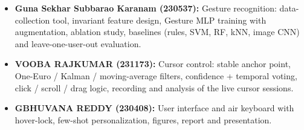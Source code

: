 \begin{itemize}\setlength\itemsep{1pt}
\item \textbf{Guna Sekhar Subbarao Karanam (230537):} Gesture recognition: data-collection tool, invariant feature design, Gesture MLP training with augmentation, ablation study, baselines (rules, SVM, RF, kNN, image CNN) and leave-one-user-out evaluation.
\item \textbf{VOOBA RAJKUMAR (231173):} Cursor control: stable anchor point, One-Euro / Kalman / moving-average filters, confidence + temporal voting, click / scroll / drag logic, recording and analysis of the live cursor sessions.
\item \textbf{GBHUVANA REDDY (230408):} User interface and air keyboard with hover-lock, few-shot personalization, figures, report and presentation.
\end{itemize}
